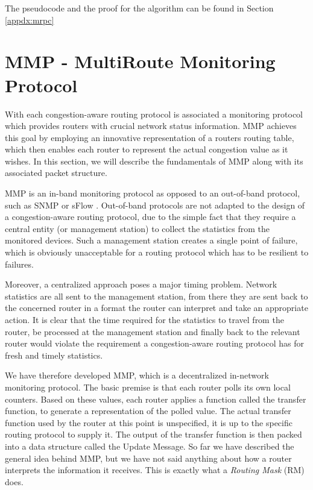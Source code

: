  The pseudocode and the proof for the algorithm can be found in Section
\ref{appdx:mrpc}


\section{MMP - MultiRoute Monitoring Protocol}

With each congestion-aware routing protocol is associated a monitoring protocol
which provides routers with crucial network status information. MMP achieves
this goal by employing an innovative representation of a routers routing table,
which then enables each router to represent the actual congestion value as it
wishes. In this section, we will describe the fundamentals of MMP along with its
associated packet structure.


MMP is an in-band monitoring protocol as opposed to an out-of-band protocol,
such as SNMP \cite{SNMP} or sFlow \cite{sFLOW}. Out-of-band protocols are not
adapted to the design of a congestion-aware routing protocol, due to the simple
fact that they require a central entity (or management station) to collect the
statistics from the monitored devices. Such a management station creates a
single point of failure, which is obviously unacceptable for a routing protocol
which has to be resilient to failures. 

Moreover, a centralized approach poses a major timing problem. Network
statistics are all sent to the management station, from there they are sent back
to the concerned router in a format the router can interpret and take an
appropriate action. It is clear that the time required for the
statistics to travel from the router, be processed at the management station
and finally back to the relevant router would violate the requirement a
congestion-aware routing protocol has for fresh and timely statistics. 

We have therefore developed MMP, which is a decentralized in-network monitoring
protocol. The basic premise is that each router polls its own local counters.
Based on these values, each router applies a function called the transfer
function, to generate a representation of the polled value. The actual transfer
function used by the router at this point is unspecified, it is up to the
specific routing protocol to supply it. The output of the transfer function is
then packed into a data structure called the Update Message. So far
we have described the general idea behind MMP, but we have not said anything
about how a router interprets the information it receives. This is exactly what
a \textit{Routing Mask} (RM) does.

